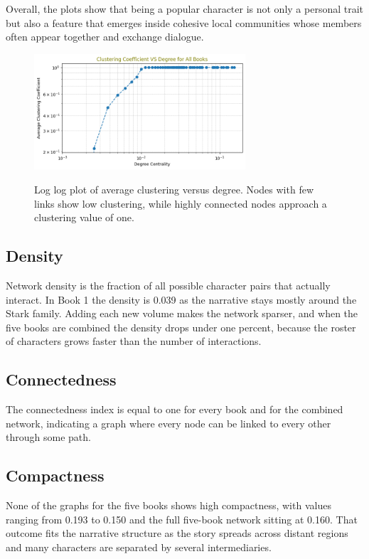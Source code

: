 \documentclass[12pt, a4paper]{article}
\begin{document}
   Overall, the plots show that being a popular character is not only a personal trait but also a feature that emerges inside cohesive local communities whose members often appear together and exchange dialogue.

\begin{figure}[htbp]
      \centering
      \includegraphics[width=0.7\textwidth]{local_clust_all_books.png}
      \label{fig:localclustcoeff}
      \caption{
Log log plot of average clustering versus degree. Nodes with few links show low clustering, while highly connected nodes approach a clustering value of one.            }
\end{figure}

\subsection*{Density}
Network density is the fraction of all possible character pairs that actually interact. In Book 1 the density is 0.039 as the narrative stays mostly around the Stark family. Adding each new volume makes the network sparser, and when the five books are combined the density drops under one percent, because the roster of characters grows faster than the number of interactions.

\subsection*{Connectedness}
The connectedness index is equal to one for every book and for the combined network, indicating a graph where every node can be linked to every other through some path. 

\subsection*{Compactness}
None of the graphs for the five books shows high compactness, with values ranging from 0.193 to 0.150 and the full five-book network sitting at 0.160. That outcome fits the narrative structure as the story spreads across distant regions and many characters are separated by several intermediaries. 
\end{document}
